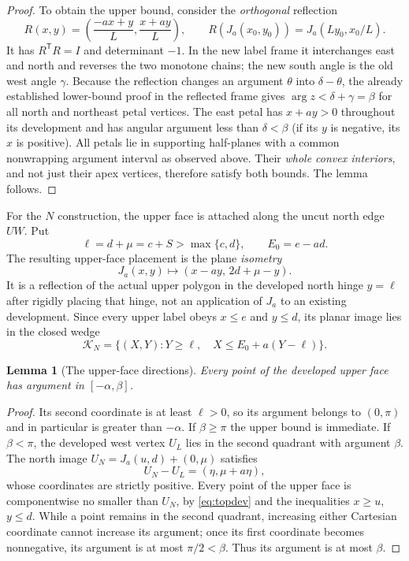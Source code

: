 \documentclass[a4paper,11pt]{amsart}
\newtheorem{lemma}[theorem]{Lemma}
\newcommand{\ang}{\operatorname{arg}}
\begin{document}
\begin{proof}
To obtain the upper bound, consider the \emph{orthogonal} reflection
\begin{equation}\label{eq:reflection}
 R(x,y)=\left(\frac{-ax+y}{L},\frac{x+ay}{L}\right),
 \qquad R(J_a(x_0,y_0))=J_a(Ly_0,x_0/L).
\end{equation}
It has $R^{\mathsf T}R=I$ and determinant $-1$. In the new label frame it interchanges east and north and reverses the two monotone chains; the new south angle is the old west angle $\gamma$. Because the reflection changes an argument $\theta$ into $\delta-\theta$, the already established lower-bound proof in the reflected frame gives $\ang z<\delta+\gamma=\beta$ for all north and northeast petal vertices. The east petal has $x+ay>0$ throughout its development and has angular argument less than $\delta<\beta$ (if its $y$ is negative, its $x$ is positive). All petals lie in supporting half-planes with a common nonwrapping argument interval as observed above. Their \emph{whole convex interiors}, and not just their apex vertices, therefore satisfy both bounds. The lemma follows.
\end{proof}

For the $N$ construction, the upper face is attached along the uncut north edge $UW$. Put
\begin{equation}\label{eq:ell}
 \ell=d+\mu=c+S>\max\{c,d\},\qquad E_0=e-ad.
\end{equation}
The resulting upper-face placement is the plane \emph{isometry}
\begin{equation}\label{eq:topdev}
 J_a(x,y)\longmapsto (x-ay,\,2d+\mu-y).
\end{equation}
It is a reflection of the actual upper polygon in the developed north hinge $y=\ell$ after rigidly placing that hinge, not an application of $J_a$ to an existing development. Since every upper label obeys $x\leq e$ and $y\leq d$, its planar image lies in the closed wedge
\begin{equation}\label{eq:wedge}
 \mathcal K_N=\{(X,Y):Y\geq\ell,\quad
 X\leq E_0+a(Y-\ell)\}.
\end{equation}

\begin{lemma}[The upper-face directions]\label{lem:topangle}
Every point of the developed upper face has argument in $[-\alpha,\beta]$.
\end{lemma}
\begin{proof}
Its second coordinate is at least $\ell>0$, so its argument belongs to $(0,\pi)$ and in particular is greater than $-\alpha$. If $\beta\geq\pi$ the upper bound is immediate. If $\beta<\pi$, the developed west vertex $U_L$ lies in the second quadrant with argument $\beta$. The north image $U_N=J_a(u,d)+(0,\mu)$ satisfies
\[
 U_N-U_L=(\eta,\mu+a\eta),
\]
whose coordinates are strictly positive. Every point of the upper face is componentwise no smaller than $U_N$, by \eqref{eq:topdev} and the inequalities $x\geq u$, $y\leq d$. While a point remains in the second quadrant, increasing either Cartesian coordinate cannot increase its argument; once its first coordinate becomes nonnegative, its argument is at most $\pi/2<\beta$. Thus its argument is at most $\beta$.
\end{proof}
\end{document}
